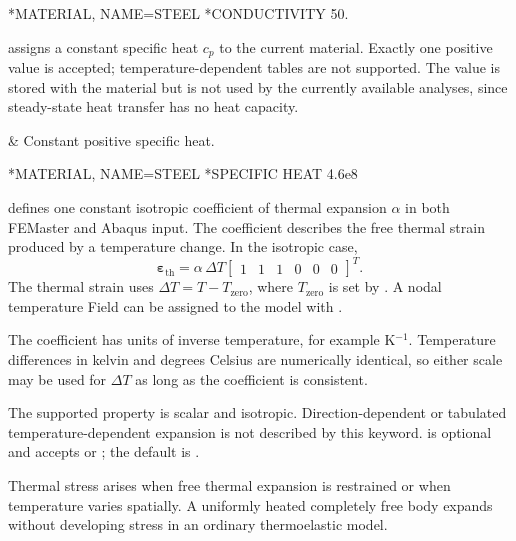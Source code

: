 \exampleheading
\begin{inputdeck}
*MATERIAL, NAME=STEEL
*CONDUCTIVITY
50.
\end{inputdeck}


 assigns a constant specific heat \(c_p\) to the current material. Exactly one positive value is accepted; temperature-dependent tables are not supported. The value is stored with the material but is not used by the currently available analyses, since steady-state heat transfer has no heat capacity.

\begin{keyworddata}
 & Constant positive specific heat. \\
\end{keyworddata}

\exampleheading
\begin{inputdeck}
*MATERIAL, NAME=STEEL
*SPECIFIC HEAT
4.6e8
\end{inputdeck}


 defines one constant isotropic coefficient of thermal expansion \(\alpha\) in both FEMaster and Abaqus input. The coefficient describes the free thermal strain produced by a temperature change. In the isotropic case,
\[
\boldsymbol\varepsilon_{\mathrm{th}}
=\alpha\,\Delta T
\begin{bmatrix}1&1&1&0&0&0\end{bmatrix}^{T}.
\]
The thermal strain uses \(\Delta T=T-T_{\mathrm{zero}}\), where \(T_{\mathrm{zero}}\) is set by . A nodal temperature Field can be assigned to the model with .

The coefficient has units of inverse temperature, for example K\(^{-1}\). Temperature differences in kelvin and degrees Celsius are numerically identical, so either scale may be used for \(\Delta T\) as long as the coefficient is consistent.

The supported property is scalar and isotropic. Direction-dependent or tabulated temperature-dependent expansion is not described by this keyword.  is optional and accepts  or ; the default is .

Thermal stress arises when free thermal expansion is restrained or when temperature varies spatially. A uniformly heated completely free body expands without developing stress in an ordinary thermoelastic model.

